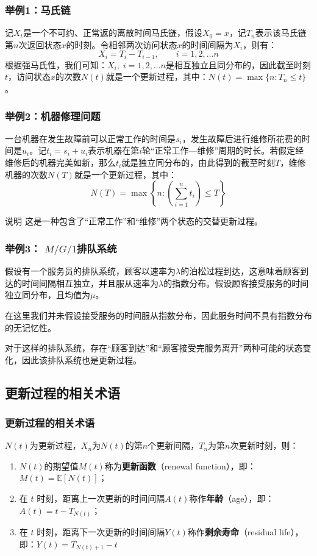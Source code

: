 \documentclass[t]{beamer}
\newcommand{\E}{\mathbb{E}}
\begin{document}
\begin{frame}
  \frametitle{举例1：马氏链}
  记$X_t$是一个不可约、正常返的离散时间马氏链，假设$X_0=x$，记$T_n$表示该马氏链第$n$次返回状态$x$的时刻。令相邻两次访问状态$x$的时间间隔为$X_i$，则有：
  \[X_i=T_{i}-T_{i-1},\qquad i=1,2,\ldots n\]
  根据强马氏性，我们可知：$X_i,\; i=1,2,\ldots n$是相互独立且同分布的，因此截至时刻$t$，访问状态$x$的次数$N(t)$就是一个更新过程，其中：$N(t)=\max\{n:T_n\le t\}$。
  

\end{frame}


\begin{frame}
  \frametitle{举例2：机器修理问题}
  一台机器在发生故障前可以正常工作的时间是$s_i$，发生故障后进行维修所花费的时间是$u_i$。记$t_i=s_i+u_i$表示机器在第$i$轮“正常工作—维修”周期的时长。若假定经维修后的机器完美如新，那么$t_i$就是独立同分布的，由此得到的截至时刻$T$，维修机器的次数$N(T)$就是一个更新过程，其中：
  $$N(T)=\max\left\{n: \left(\sum^{n}_{i=1}t_i \right) \le T\right\}$$
  
\begin{block}{说明}
  这是一种包含了“正常工作”和“维修”两个状态的交替更新过程。
\end{block}
\end{frame}


\begin{frame}
  \frametitle{举例3： $M/G/1$排队系统}
 假设有一个服务员的排队系统，顾客以速率为$\lambda$的泊松过程到达，这意味着顾客到达的时间间隔相互独立，并且服从速率为$\lambda$的指数分布。假设顾客接受服务的时间独立同分布，且均值为$\mu$。
 
 在这里我们并未假设接受服务的时间服从指数分布，因此服务时间不具有指数分布的无记忆性。
 
 对于这样的排队系统，存在“顾客到达”和“顾客接受完服务离开”两种可能的状态变化，因此该排队系统也是更新过程。
\end{frame}


\subsection{更新过程的相关术语}
\begin{frame}
  \frametitle{更新过程的相关术语}
  $N(t)$为更新过程，$X_n$为$N(t)$的第$n$个更新间隔，$T_n$为第$n$次更新时刻，则：
  \begin{enumerate}
      \item $N(t)$的期望值$M(t)$称为{\bf 更新函数}（renewal function），即：$M(t)=\E[N(t)]$；
      \item 在 $t$ 时刻，距离上一次更新的时间间隔$A(t)$称作{\bf 年龄}（age），即：$A(t)=t-T_{N(t)}$；
      \item 在 $t$ 时刻，距离下一次更新的时间间隔$Y(t)$称作{\bf 剩余寿命}（residual life），即：$Y(t)=T_{N(t)+1}-t$
  \end{enumerate}
  

\end{frame}
\end{document}
